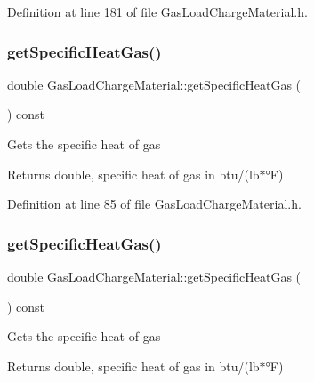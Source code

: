 Definition at line 181 of file Gas\+Load\+Charge\+Material.\+h.

\mbox{\label{class_gas_load_charge_material_a66e956e7a52b1032a3e8a725f26fa580}} 
\subsubsection{\texorpdfstring{get\+Specific\+Heat\+Gas()}{getSpecificHeatGas()}\hspace{0.1cm}{\footnotesize\ttfamily [1/3]}}
{\footnotesize\ttfamily double Gas\+Load\+Charge\+Material\+::get\+Specific\+Heat\+Gas (\begin{DoxyParamCaption}{ }\end{DoxyParamCaption}) const\hspace{0.3cm}{\ttfamily [inline]}}

Gets the specific heat of gas \begin{DoxyReturn}{Returns}
double, specific heat of gas in btu/(lb$\ast$°F) 
\end{DoxyReturn}


Definition at line 85 of file Gas\+Load\+Charge\+Material.\+h.

\mbox{\label{class_gas_load_charge_material_a66e956e7a52b1032a3e8a725f26fa580}} 
\subsubsection{\texorpdfstring{get\+Specific\+Heat\+Gas()}{getSpecificHeatGas()}\hspace{0.1cm}{\footnotesize\ttfamily [2/3]}}
{\footnotesize\ttfamily double Gas\+Load\+Charge\+Material\+::get\+Specific\+Heat\+Gas (\begin{DoxyParamCaption}{ }\end{DoxyParamCaption}) const\hspace{0.3cm}{\ttfamily [inline]}}

Gets the specific heat of gas \begin{DoxyReturn}{Returns}
double, specific heat of gas in btu/(lb$\ast$°F) 
\end{DoxyReturn}


